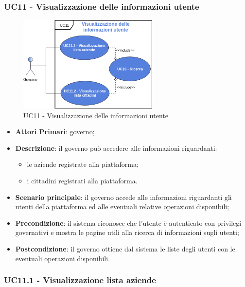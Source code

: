  \subsubsection{UC11 - Visualizzazione delle informazioni utente}
 \begin{figure}[h]
 	\includegraphics[width=7cm]{res/images/UC11-Generale.png}
 	\centering
 	\caption{UC11 - Visualizzazione delle informazioni utente}
 	
 \end{figure}
 \begin{itemize}
 	\item \textbf{Attori Primari}: governo;
 	\item \textbf{Descrizione}: il governo può accedere alle informazioni riguardanti:
 	\begin{itemize}
 		\item le aziende registrate alla piattaforma;
 		\item i cittadini registrati alla piattaforma.

 	\end{itemize}
 	\item \textbf{Scenario principale}: il governo accede alle informazioni riguardanti gli utenti della piattaforma ed alle eventuali relative operazioni disponibili;

 	\item \textbf{Precondizione}: il sistema riconosce che l'utente è autenticato con privilegi governativi e mostra le pagine utili alla ricerca di informazioni sugli utenti;
 	
 	\item \textbf{Postcondizione}: il governo ottiene dal sistema le liste degli utenti con le eventuali operazioni disponibili.
 \end{itemize}

\subsubsection{UC11.1 - Visualizzazione lista aziende}

